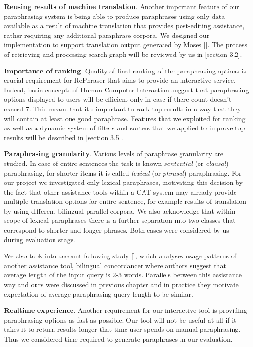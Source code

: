 \textbf{Reusing results of machine translation}. Another important feature of our paraphrasing system is being able to produce paraphrases using only data available as a result of machine translation that provides post-editing assistance, rather requiring any additional paraphrase corpora. We designed our implementation to support translation output generated by Moses []. The process of retrieving and processing search graph will be reviewed by us in [section 3.2].

\textbf{Importance of ranking}. Quality of final ranking of the paraphrasing options is crucial requirement for RePhraser that aims to provide an interactive service. Indeed, basic concepts of Human-Computer Interaction suggest that paraphrasing options displayed to users will be efficient only in case if there count doesn't exceed 7. This means that it's important to rank top results in a way that they will contain at least one good paraphrase. Features that we exploited for ranking as well as a dynamic system of filters and sorters that we applied to improve top results will be described in [section 3.5].  


\textbf{Paraphrasing granularity}. Various levels of paraphrase granularity are studied. In case of entire sentences the task is known \textit{sentential} (or \textit{clausal}) paraphrasing, for shorter items it is called \textit{lexical} (or \textit{phrasal}) paraphrasing. For our project we investigated only lexical paraphrases, motivating this decision by the fact that other assistance tools within a CAT system may already provide multiple translation options for entire sentence, for example results of translation by using different bilingual parallel corpora. We also acknowledge that within scope of lexical paraphrases there is a further separation into two classes that correspond to shorter and longer phrases. Both cases were considered by us during evaluation stage.

We also took into account following study {[]}, which analyses usage patterns of another assistance tool, bilingual concordancer where authors suggest that average length of the input query is 2-3 words. Parallels between this assistance way and ours were discussed in previous chapter and in practice they motivate expectation of average paraphrasing query length to be similar.

\textbf{Realtime experience}. Another requirement for our interactive tool is providing paraphrasing options as fast as possible. Our tool will not be useful at all if it takes it to return results longer that time user spends on manual paraphrasing. Thus we considered time required to generate paraphrases in our evaluation. 

